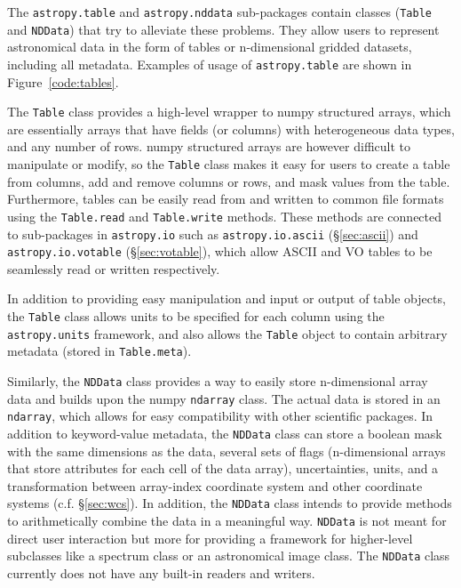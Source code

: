 \documentclass[traditabstract]{aa}
\begin{document}
The \texttt{astropy.table} and \texttt{astropy.nddata} sub-packages contain
classes (\texttt{Table} and \texttt{NDData}) that try to alleviate these
problems. They allow users to represent astronomical data in the form of tables
or n-dimensional gridded datasets, including all metadata. Examples of usage
of \texttt{astropy.table} are shown in Figure~\ref{code:tables}.

The \texttt{Table} class provides a high-level wrapper to \gls{numpy} structured
arrays, which are essentially arrays that have fields (or columns) with
heterogeneous data types, and any number of rows. \gls{numpy} structured arrays are
however difficult to manipulate or modify, so the \texttt{Table} class makes it
easy for users to create a table from columns, add and remove columns or rows,
and mask values from the table. Furthermore, tables can be easily read from and
written to common file formats using the \texttt{Table.read} and
\texttt{Table.write} methods. These methods are connected to sub-packages in
\texttt{astropy.io} such as \texttt{astropy.io.ascii} (\S\ref{sec:ascii}) and
\texttt{astropy.io.votable} (\S\ref{sec:votable}), which allow ASCII and VO
tables to be seamlessly read or written respectively.

In addition to providing easy manipulation and input or output of table objects,
the \texttt{Table} class allows units to be specified for each column using the
\texttt{astropy.units} framework, and also allows the \texttt{Table} object to
contain arbitrary metadata (stored in \texttt{Table.meta}).

Similarly, the \texttt{NDData} class provides a way to easily store n-dimensional array
data and builds upon the \gls{numpy} \texttt{ndarray} class. The actual data is
stored in an \texttt{ndarray}, which allows for easy compatibility with
other scientific packages. In addition to keyword-value metadata, the
\texttt{NDData} class can store a boolean mask with the same dimensions as the
data, several sets of flags (n-dimensional arrays that store attributes for
each cell of the data array), uncertainties, units, and a transformation
between array-index coordinate system and other coordinate systems (c.f.
\S\ref{sec:wcs}). In addition, the \texttt{NDData} class intends to provide
methods to arithmetically combine the data in a meaningful way. \texttt{NDData}
is not meant for direct user interaction but more for providing a framework for
higher-level subclasses like a spectrum class or an astronomical image class.
The \texttt{NDData} class currently does not have any built-in readers and
writers.
\end{document}

